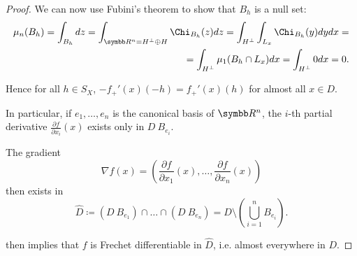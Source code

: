 \begin{proof}
  We can now use Fubini's theorem to show that \( B_h \) is a null set:
  \begin{align*}
    \mu_n(B_h)
    =
    \int_{B_h} dz
    =
    \int_{\BR^n = H^\perp \oplus H} \Chi_{B_h} (z) dz
    =
    \int_{H^\perp} \int_{L_x} \Chi_{B_h} (y) dy dx
    = \\ =
    \int_{H^\perp} \mu_1(B_h \cap L_x) dx
    =
    \int_{H^\perp} 0 dx
    =
    0.
  \end{align*}

  Hence for all \( h \in S_X \), \( -f_+'(x)(-h) = f_+'(x)(h) \) for almost all \( x \in D \).

  In particular, if \( e_1, \ldots, e_n \) is the canonical basis of \( \BR^n \), the \( i \)-th partial derivative \( \frac{\partial f} {\partial x_i} (x) \) exists only in \( D \ B_{e_i} \).

  The gradient
  \begin{equation*}
    \nabla f(x) = \left( \frac{\partial f} {\partial x_1} (x), \ldots, \frac{\partial f} {\partial x_n} (x) \right)
  \end{equation*}
  then exists in
  \begin{equation*}
    \hat D \coloneqq (D \ B_{e_1}) \cap \ldots \cap (D \ B_{e_n}) = D \setminus \left( \bigcup_{i=1}^n B_{e_i} \right).
  \end{equation*}

   then implies that \( f \) is Frechet differentiable in \( \hat D \), i.e. almost everywhere in \( D \).
\end{proof}
